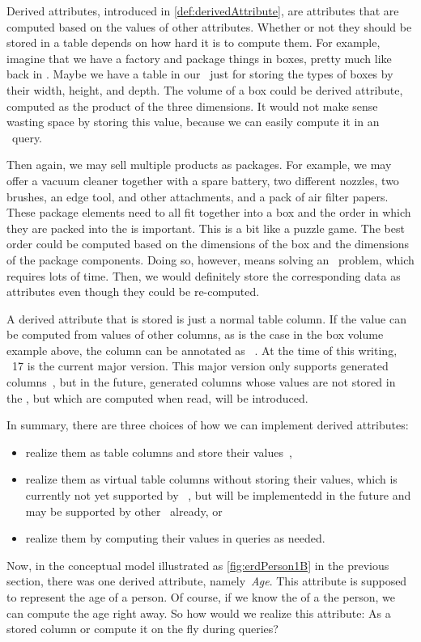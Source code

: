 %
%
Derived attributes, introduced in \cref{def:derivedAttribute}, are attributes that are computed based on the values of other attributes.
Whether or not they should be stored in a table depends on how hard it is to compute them.
For example, imagine that we have a factory and package things in boxes, pretty much like back in .
Maybe we have a table in our \db\ just for storing the types of boxes by their width, height, and depth.
The volume of a box could be derived attribute, computed as the product of the three dimensions.
It would not make sense wasting space by storing this value, because we can easily compute it in an \sql\ query.

Then again, we may sell multiple products as packages.
For example, we may offer a vacuum cleaner together with a spare battery, two different nozzles, two brushes, an edge tool, and other attachments, and a pack of air filter papers.
These package elements need to all fit together into a box and the order in which they are packed into the is important.
This is a bit like a puzzle game.
The best order could be computed based on the dimensions of the box and the dimensions of the package components.
Doing so, however, means solving an \npHard\ problem, which requires lots of time.
Then, we would definitely store the corresponding data as attributes even though they could be re-computed.

A derived attribute that is stored is just a normal table column.
If the value can be computed from values of other columns, as is the case in the box volume example above, the column can be annotated as ~\cite{PGDG:PD:GC}.
At the time of this writing, \postgresql~17 is the current major version.
This major version only supports  generated columns~\cite{PGDG:PD:GC}, but in the future,  generated columns whose values are not stored in the \db, but which are computed when read, will be introduced.

In summary, there are three choices of how we can implement derived attributes:%
%
\begin{itemize}%
%
\item realize them as  table columns and store their values~\cite{PGDG:PD:GC},%
\item realize them as virtual  table columns without storing their values, which is currently not yet supported by \postgresql~\cite{PGDG:PD:GC}, but will be implementedd in the future and may be supported by other \dbms\ already, or%
\item realize them by computing their values in  queries as needed.%
%
\end{itemize}%
%
Now, in the conceptual model illustrated as \cref{fig:erdPerson1B} in the previous section, there was one derived attribute, namely~\emph{Age}.
This attribute is supposed to represent the age of a person.
Of course, if we know the  of a the person, we can compute the age right away.
So how would we realize this attribute:
As a stored  column or compute it on the fly during  queries?

